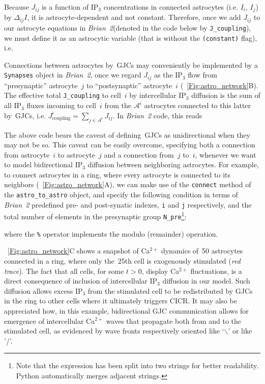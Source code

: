 \documentclass[a4paper, 11pt]{article}
\newcommand{\brian}{\emph{Brian~2}\xspace}
\newcommand*{\figref}[1]{\figurename~\ref{#1}}
\begin{document}
Because $J_{ij}$ is a function of IP$_3$ concentrations in connected astrocytes (i.e. $I_i,\,I_j$) by $\Delta_{ij} I$, it is astrocyte-dependent and not constant.
Therefore, once we add $J_{ij}$ to our astrocyte equations in \brian (denoted in the code below by \lstinline|J_coupling|), we must define it as an astrocytic variable (that is without the \lstinline|(constant)| flag), i.e.


Connections between astrocytes by~GJCs may conveniently be implemented by a \lstinline|Synapses| object in \brian, once we regard $J_{ij}$ as the IP$_3$ flow from ``presynaptic'' astrocyte~$j$ to ``postsynaptic'' astrocyte~$i$ (\figref{Fig:astro_network}B).
The effective total \lstinline|J_coupling| to cell~$i$ by intercellular IP$_3$ diffusion is the sum of all IP$_3$ fluxes incoming to cell~$i$ from the $\mathcal{A}^i$ astrocytes connected to this latter by~GJCs, i.e. $J_\mathrm{coupling}^i = \sum_{j \in \mathcal{A}^i} J_{ij}$. In \brian code, this reads 


The above code bears the caveat of defining~GJCs as unidirectional when they may not be so.
This caveat can be easily overcome, specifying both a connection from astrocyte~$i$ to astrocyte~$j$ and a connection from~$j$ to~$i$, whenever we want to model bidirectional IP$_3$ diffusion between neighboring astrocytes. For example, to connect astrocytes in a ring, where every astrocyte is connected to its neighbors (\figref{Fig:astro_network}A), we can make use of the \lstinline|connect| method of the \lstinline|astro_to_astro| object, and specify the following condition in terms of \brian predefined pre- and post-synatic indexes, \lstinline|i| and \lstinline|j| respectively, and the total number of elements in the presynaptic group \lstinline|N_pre|\footnote{Note that the expression has been split into two strings for better readability. Python automatically merges adjacent strings.}:

where the \lstinline|%| operator implements the modulo (remainder) operation.

\figref{Fig:astro_network}C shows a snapshot of Ca$^{2+}$ dynamics of~50 astrocytes connected in a ring, where only the~25th cell is exogenously stimulated (\textit{red trace}).
The fact that all cells, for some $t>0$, display Ca$^{2+}$ fluctuations, is a direct consequence of inclusion of intercellular IP$_3$ diffusion in our model.
Such diffusion allows excess IP$_3$ from the stimulated cell to be redistributed by GJCs in the ring to other cells where it ultimately triggers CICR.
It may also be appreciated how, in this example, bidirectional GJC communication allows for emergence of intercellular Ca$^{2+}$ waves that propagate both from and to the stimulated cell, as evidenced by wave fronts respectively oriented like `$\backslash$' or like '/'.
\end{document}
